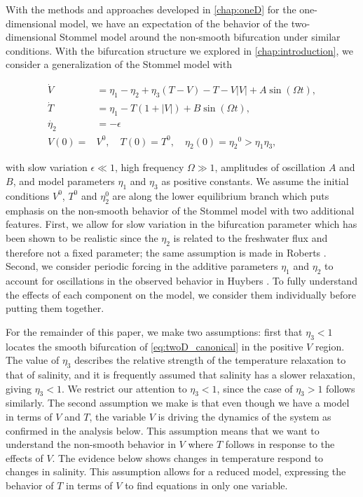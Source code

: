 With the methods and approaches developed in \autoref{chap:oneD} for the one-dimensional model, we have an expectation of the behavior of the two-dimensional Stommel model around the non-smooth bifurcation under similar conditions. With the bifurcation structure we explored in \autoref{chap:introduction}, we consider a generalization of the Stommel model with

\begin{equation}\label{eq:twoD_canonical}
  \begin{aligned}
   \dot{V} & =  \eta_1-\eta_2+\eta_3(T-V)-T-V|V|+A\sin(\Omega t), \\
   \dot{T}     & =  \eta_1-T(1+|V|)+B\sin(\Omega t),  \\
  \dot{\eta_2}  & =  -\epsilon\\
  V(0)=&V^0,\quad T(0)=T^0, \quad \eta_2(0)={\eta_2}^0>\eta_1\eta_3,
  \end{aligned}
\end{equation}

with slow variation $\epsilon\ll 1$, high frequency $\Omega\gg 1$, amplitudes of oscillation $A$ and $B$, and model parameters $\eta_1$ and $\eta_3$ as positive constants. We assume the initial conditions $V^0$, $T^0$ and $\eta_2^0$ are along the lower equilibrium branch which puts emphasis on the non-smooth behavior of the Stommel model with two additional features. First, we allow for slow variation in the bifurcation parameter which has been shown to be realistic since the $\eta_2$ is related to the freshwater flux and therefore not a fixed parameter; the same assumption is made in Roberts \cite{roberts2017relaxation}. Second, we consider periodic forcing in the additive parameters $\eta_1$ and $\eta_2$ to account for oscillations in the observed behavior in Huybers \cite{huybers2005obliquity}. To fully understand the effects of each component on the model, we consider them individually before putting them together.

For the remainder of this paper, we make two assumptions: first that $\eta_3<1$ locates the smooth bifurcation of \eqref{eq:twoD_canonical}  in the positive $V$ region. The value of $\eta_3$ describes the relative strength of the temperature relaxation to that of salinity, and it is frequently assumed that salinity has a slower relaxation, giving $\eta_3<1$. We restrict our attention to $\eta_3<1$, since the case of $\eta_3>1$ follows similarly. The second assumption we make is that even though we have a model in terms of $V$ and $T$, the variable $V$ is driving the dynamics of the system as confirmed in the analysis below. This assumption means that we want to understand the non-smooth behavior in $V$ where $T$ follows in response to the effects of $V$. The evidence below shows changes in temperature respond to changes in salinity. This assumption allows for a reduced model, expressing the behavior of $T$ in terms of $V$ to find equations in only one variable.

